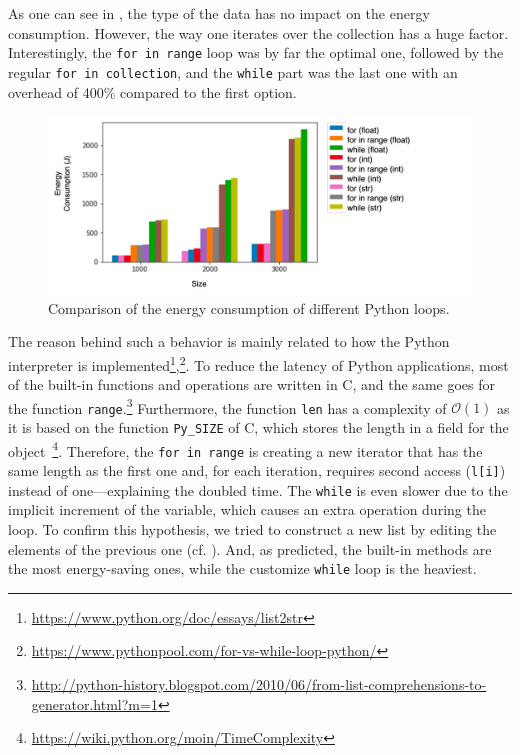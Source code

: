 As one can see in , the type of the data has no impact on the energy consumption.
However, the way one iterates over the collection has a huge factor.
Interestingly, the \texttt{for in range} loop was by far the optimal one, followed by the regular \texttt{for in collection}, and the \texttt{while} part was the last one with an overhead of 400\% compared to the first option.

\begin{figure}
    \centering
    \includegraphics[width=\linewidth]{imgs/python_iterations}
    \caption{Comparison of the energy consumption of different Python loops.}
    \label{fig:pythonloops}
\end{figure}

The reason behind such a behavior is mainly related to how the Python interpreter is implemented\footnote{\url{https://www.python.org/doc/essays/list2str}},\footnote{\url{https://www.pythonpool.com/for-vs-while-loop-python/}}.
To reduce the latency of Python applications, most of the built-in functions and operations are written in C, and the same goes for the function \texttt{range}.\footnote{\url{ http://python-history.blogspot.com/2010/06/from-list-comprehensions-to-generator.html?m=1}}
Furthermore, the function \texttt{len} has a complexity of $\mathcal{O}(1)$ as it is based on the function \texttt{Py\_SIZE} of C, which stores the length in a field for the object~\footnote{\url{https://wiki.python.org/moin/TimeComplexity}}.
Therefore, the \texttt{for in range} is creating a new iterator that has the same length as the first one and, for each iteration, requires second access (\texttt{l[i]}) instead of one---explaining the doubled time.
The \texttt{while} is even slower due to the implicit increment of the variable, which causes an extra operation during the loop.
To confirm this hypothesis, we tried to construct a new list by editing the elements of the previous one (cf. ).
And, as predicted, the built-in methods are the most energy-saving ones, while the customize \texttt{while} loop is the heaviest.


